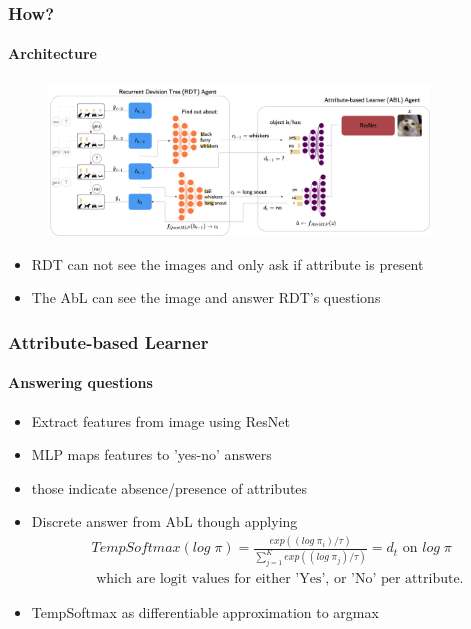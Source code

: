 \documentclass[9pt]{beamer}
\begin{document}
\begin{frame}
\frametitle{How?}
\framesubtitle{Architecture}
\begin{figure}
	\centering
	\includegraphics[width=0.9\textwidth]{images/uncertaintRDTC.pdf} 
	\label{fig:uncertainRDTC}
\end{figure}
\begin{itemize}
	\item RDT can not see the images and only ask if attribute is present
	\item The AbL can see the image and answer RDT's questions
\end{itemize}
\end{frame} 





\begin{frame}
\frametitle{Attribute-based Learner}
\framesubtitle{Answering questions}
\begin{itemize}
	\item Extract features from image using ResNet
	\item MLP maps features to 'yes-no' answers
	\item those indicate absence/presence of attributes
	\item Discrete answer from AbL though applying \begin{align*}
	&TempSoftmax(log\;\pi) = \frac{exp((log\;\pi_i)/\tau)}{\sum_{j=1}^{K}exp((log\;\pi_j)/\tau)} = d_t
	\text{ on }
	log\;\pi \\
	&\text{ which are logit values for either 'Yes', or 'No' per attribute.}
\end{align*}
\item TempSoftmax as differentiable approximation to argmax
\end{itemize}
\end{frame}
\end{document}
